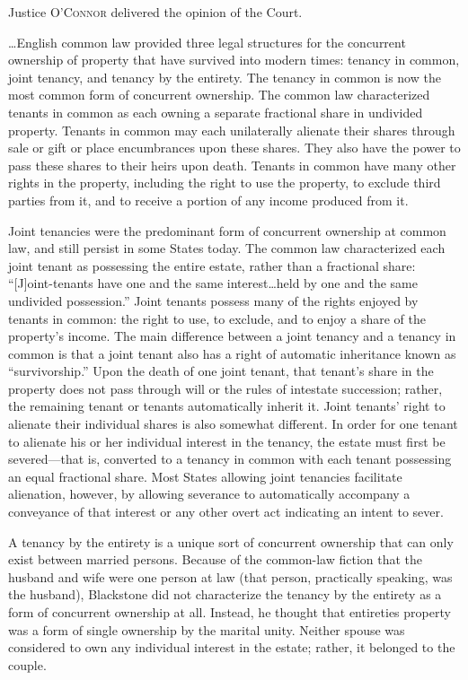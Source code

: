 

\opinion Justice \textsc{O'Connor} delivered the opinion of the Court.

\dots English common law provided three legal structures for the concurrent
ownership of property that have survived into modern times: tenancy in common,
joint tenancy, and tenancy by the entirety. The tenancy in common is now the
most common form of concurrent ownership. The common law characterized tenants
in common as each owning a separate fractional share in undivided property.
Tenants in common may each unilaterally alienate their shares through sale or
gift or place encumbrances upon these shares. They also have the power to pass
these shares to their heirs upon death. Tenants in common have many other
rights in the property, including the right to use the property, to exclude
third parties from it, and to receive a portion of any income produced from it.


Joint tenancies were the predominant form of concurrent ownership at common law,
and still persist in some States today. The common law characterized each joint
tenant as possessing the entire estate, rather than a fractional share:
``[J]oint-tenants have one and the same interest\dots held by one and the
same undivided possession.'' Joint tenants possess many of the rights enjoyed
by tenants in common: the right to use, to exclude, and to enjoy a share of the
property's income. The main difference between a joint tenancy and a tenancy in
common is that a joint tenant also has a right of automatic inheritance known
as ``survivorship.'' Upon the death of one joint tenant, that tenant's share in
the property does not pass through will or the rules of intestate succession;
rather, the remaining tenant or tenants automatically inherit it. Joint
tenants' right to alienate their individual shares is also somewhat different.
In order for one tenant to alienate his or her individual interest in the
tenancy, the estate must first be severed---that is, converted to a tenancy in
common with each tenant possessing an equal fractional share. Most States
allowing joint tenancies facilitate alienation, however, by allowing severance
to automatically accompany a conveyance of that interest or any other overt act
indicating an intent to sever.

A tenancy by the entirety is a unique sort of concurrent ownership that can only
exist between married persons. Because of the common-law fiction that the
husband and wife were one person at law (that person, practically speaking, was
the husband), Blackstone did not characterize the tenancy by the entirety as a
form of concurrent ownership at all. Instead, he thought that entireties
property was a form of single ownership by the marital unity. Neither spouse
was considered to own any individual interest in the estate; rather, it
belonged to the couple.

